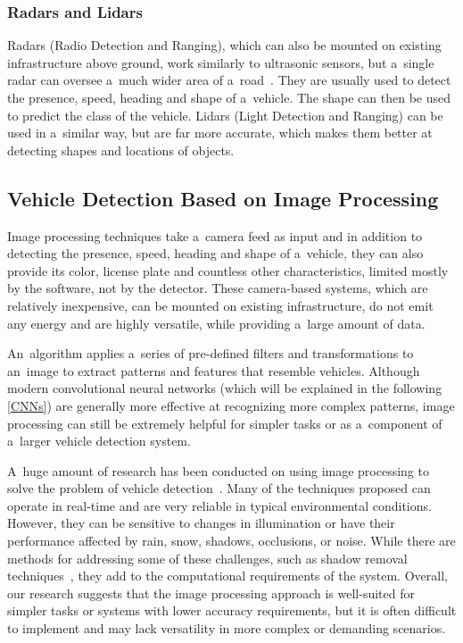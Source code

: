 \subsubsection*{Radars and Lidars}

Radars (Radio Detection and Ranging), which can also be mounted on existing
infrastructure above ground, work similarly to ultrasonic sensors, but a~single
radar can oversee a~much wider area of a~road~\cite{RadarSensors}. They are
usually used to detect the presence, speed, heading and shape of a~vehicle. The
shape can then be used to predict the class of the vehicle. Lidars (Light
Detection and Ranging) can be used in a~similar way, but are far more accurate,
which makes them better at detecting shapes and locations of objects.



\subsection{Vehicle Detection Based on Image Processing}

Image processing techniques take a~camera feed as input and in addition to
detecting the presence, speed, heading and shape of a~vehicle, they can also
provide its color, license plate and countless other characteristics, limited
mostly by the software, not by the detector. These camera-based systems, which
are relatively inexpensive, can be mounted on existing infrastructure, do not
emit any energy and are highly versatile, while providing a~large amount of
data.

An~algorithm applies a~series of pre-defined filters and transformations to
an~image to extract patterns and features that resemble vehicles. Although
modern convolutional neural networks (which will be explained in the following
\autoref{CNNs}) are generally more effective at recognizing more complex
patterns, image processing can still be extremely helpful for simpler tasks or
as a~component of a~larger vehicle detection system.

A~huge amount of research has been conducted on using image processing to solve
the problem of vehicle detection~\cite{ImageProcessingOverview}. Many of the
techniques proposed can operate in real-time and are very reliable in typical
environmental conditions. However, they can be sensitive to changes in
illumination or have their performance affected by rain, snow, shadows,
occlusions, or noise. While there are methods for addressing some of these
challenges, such as shadow removal techniques~\cite{ShadowRemoval}, they add to
the computational requirements of the system. Overall, our research suggests
that the image processing approach is well-suited for simpler tasks or systems
with lower accuracy requirements, but it is often difficult to implement and may
lack versatility in more complex or demanding scenarios.


